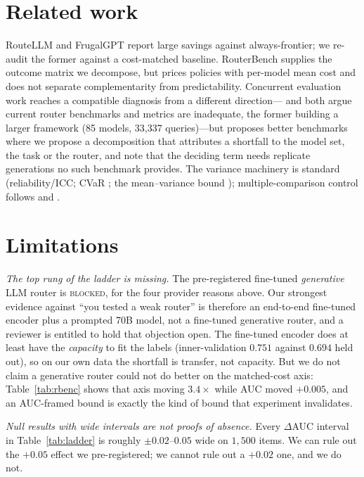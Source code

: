 \documentclass[10pt]{article}
\begin{document}
\section{Related work}

RouteLLM \citep{ong2024routellm} and FrugalGPT \citep{chen2023frugalgpt} report
large savings against always-frontier; we re-audit the former against a
cost-matched baseline. RouterBench \citep{hu2024routerbench} supplies the outcome
matrix we decompose, but prices policies with per-model mean cost and does not
separate complementarity from predictability. Concurrent evaluation work reaches
a compatible diagnosis from a different direction---\citet{yuan2025whoroutes}
and \citet{huang2025routereval} both argue current router benchmarks and metrics
are inadequate, the former building a larger framework (85 models, 33{,}337
queries)---but proposes better benchmarks where we propose a decomposition that
attributes a shortfall to the model set, the task or the router, and note that
the deciding term needs replicate generations no such benchmark provides. The
variance machinery is standard (reliability/ICC; CVaR
\citep{rockafellar2000cvar}; the mean--variance bound
\citep{bhatia2000variance}); multiple-comparison control follows
\citet{holm1979} and \citet{benjamini1995}.

\section{Limitations}

\emph{The top rung of the ladder is missing.} The pre-registered fine-tuned
\emph{generative} LLM router is \textsc{blocked}, for the four provider reasons
above. Our strongest evidence against ``you tested a weak router'' is therefore
an end-to-end fine-tuned encoder plus a prompted 70B model, not a fine-tuned
generative router, and a reviewer is entitled to hold that objection open. The
fine-tuned encoder does at least have the \emph{capacity} to fit the labels
(inner-validation $0.751$ against $0.694$ held out), so on our own data the
shortfall is transfer, not capacity. But we do not claim a generative router
could not do better on the matched-cost axis: Table~\ref{tab:rbenc} shows that
axis moving $3.4\times$ while AUC moved $+0.005$, and an AUC-framed bound is
exactly the kind of bound that experiment invalidates.

\emph{Null results with wide intervals are not proofs of absence.} Every
$\Delta$AUC interval in Table~\ref{tab:ladder} is roughly $\pm0.02$--$0.05$
wide on $1{,}500$ items. We can rule out the $+0.05$ effect we pre-registered;
we cannot rule out a $+0.02$ one, and we do not.
\end{document}
